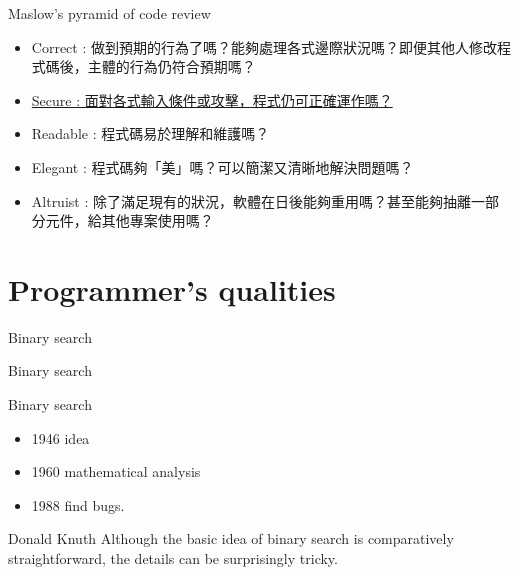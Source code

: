 \documentclass{beamer}
\begin{document}
\begin{CJK*}{UTF8}{bsmi}
    \begin{frame}{Maslow’s pyramid of code review}
        \begin{itemize}
            \item  Correct  : 做到預期的行為了嗎？能夠處理各式邊際狀況嗎？即便其他人修改程式碼後，主體的行為仍符合預期嗎？
            \item  \underline{Secure : 面對各式輸入條件或攻擊，程式仍可正確運作嗎？}
            \item  Readable : 程式碼易於理解和維護嗎？
            \item  Elegant  : 程式碼夠「美」嗎？可以簡潔又清晰地解決問題嗎？
            \item  Altruist : 除了滿足現有的狀況，軟體在日後能夠重用嗎？甚至能夠抽離一部分元件，給其他專案使用嗎？
        \end{itemize}
    \end{frame}

    \section{Programmer's qualities}
    \begin{frame}{Binary search}
        
    \end{frame}

    \begin{frame}{Binary search}
        
    \end{frame}

    \begin{frame}{Binary search}
        \begin{itemize}
            \item 1946 idea
            \item 1960 mathematical analysis
            \item 1988 find bugs.
        \end{itemize}
        \begin{block}{Donald Knuth}
            Although the basic idea of binary search is comparatively straightforward, the details can be surprisingly tricky.
        \end{block}
    \end{frame}


\end{CJK*}
\end{document}
